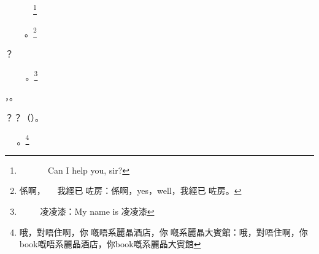 \begin{dialogue}
󱤽 󰀞 󱫮 󱙟 󱓉？\footnote{󱤽 󰀞 󱫮 󱙟 󱓉：Can I help you, sir? }
\end{dialogue}

\begin{dialogue}
，\ruby
󱖞，󲇩，󰍆。\footnote{係啊，󱖞，󲇩，我經已󰍆咗房：係啊，yes，well，我經已󰍆咗房。}
\end{dialogue}

\begin{dialogue}
？
\end{dialogue}

\begin{dialogue}
    
    󰕝 󰳦 󰄕 。\footnote{󰕝 󰳦 󰄕 凌凌漆：My name is 凌凌漆}
\end{dialogue}


\begin{dialogue}
，。
\end{dialogue}

\begin{dialogue}
？？（）。
\end{dialogue}

\begin{dialogue}
，，󰍆，󰍆。\footnote{哦，對唔住啊，你󰍆嘅唔系麗晶酒店，你󰍆嘅系麗晶大賓館：哦，對唔住啊，你book嘅唔系麗晶酒店，你book嘅系麗晶大賓館}
\end{dialogue}

